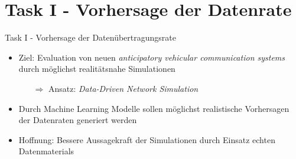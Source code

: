 \section{Task I - Vorhersage der Datenrate}
\begin{frame}{Task I - Vorhersage der Daten\"ubertragungsrate}
    \begin{itemize}
        \item Ziel: Evaluation von neuen \textit{anticipatory vehicular communication systems} durch m\"oglichst
            realit\"atsnahe Simulationen \cite{IEEE}
            \begin{itemize}
                \item[$\Rightarrow$] Ansatz: \textit{Data-Driven Network Simulation}
            \end{itemize}
        \item Durch Machine Learning Modelle sollen m\"oglichst realistische Vorhersagen der Datenraten generiert werden
        \item Hoffnung: Bessere Aussagekraft der Simulationen durch Einsatz echten Datenmaterials
    \end{itemize}
\end{frame}
